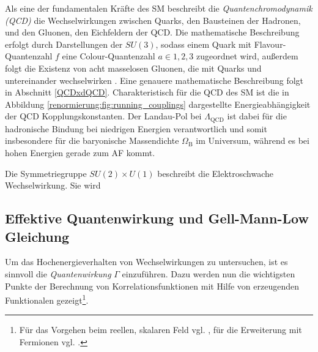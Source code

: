     Als eine der fundamentalen Kräfte des SM beschreibt die 
    \textit{Quantenchromodynamik (QCD)} die Wechselwirkungen 
    zwischen Quarks, den Bausteinen der Hadronen, und den Gluonen, den 
    Eichfeldern der QCD. Die mathematische Beschreibung erfolgt durch 
    Darstellungen der $SU(3)$, sodass einem Quark mit Flavour-Quantenzahl 
    $f$ eine Colour-Quantenzahl $a\in{1,2,3}$ zugeordnet wird, außerdem 
    folgt die Existenz von acht masselosen Gluonen, die mit Quarks und 
    untereinander wechselwirken \cite{Ellis_Webber}. Eine genauere 
    mathematische Beschreibung folgt in Abschnitt \ref{QCDxdQCD}. 
    Charakteristisch für die QCD des SM ist die in Abbildung 
    \ref{renormierung:fig:running_couplings} dargestellte Energieabhängigkeit 
    der QCD Kopplungskonstanten. Der Landau-Pol bei $\Lambda_\text{QCD}$ ist 
    dabei für die hadronische Bindung bei niedrigen Energien verantwortlich 
    und somit insbesondere für die baryonische Massendichte $\Omega_\text{B}$ 
    im Universum, während es bei hohen Energien gerade zum AF kommt.
    
    Die Symmetriegruppe $SU(2)\times U(1)$ beschreibt die Elektroschwache 
    Wechselwirkung. Sie wird 
    
  \subsection{Effektive Quantenwirkung und Gell-Mann-Low Gleichung}
    Um das Hochenergieverhalten von Wechselwirkungen zu untersuchen, ist 
    es sinnvoll die \textit{Quantenwirkung} $\Gamma$ einzuführen. Dazu werden 
    nun die wichtigsten Punkte der Berechnung von Korrelationsfunktionen mit 
    Hilfe von erzeugenden Funktionalen gezeigt\footnote{Für das Vorgehen beim 
    reellen, skalaren Feld vgl. \cite{Zinn}, für die Erweiterung mit Fermionen 
    vgl. \cite{Schwartz}.}.
    
